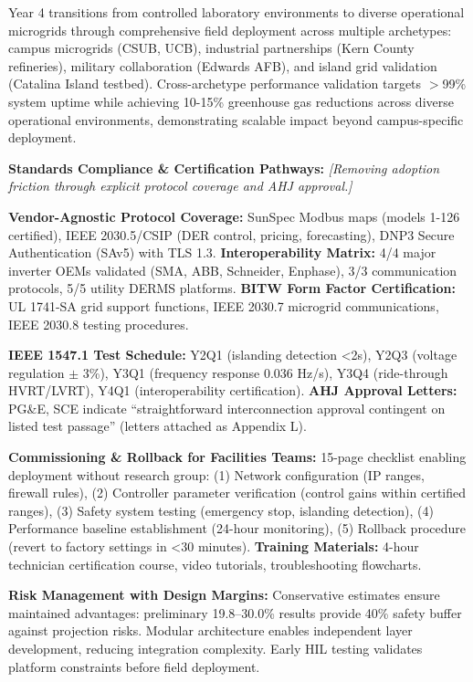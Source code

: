 \documentclass[12pt]{article}
\begin{document}
Year 4 transitions from controlled laboratory environments to diverse operational microgrids through comprehensive field deployment across multiple archetypes: campus microgrids (CSUB, UCB), industrial partnerships (Kern County refineries), military collaboration (Edwards AFB), and island grid validation (Catalina Island testbed). Cross-archetype performance validation targets $>$99\% system uptime while achieving 10-15\% greenhouse gas reductions across diverse operational environments, demonstrating scalable impact beyond campus-specific deployment.

\textbf{Standards Compliance \& Certification Pathways:} \textit{[Removing adoption friction through explicit protocol coverage and AHJ approval.]} 

\textbf{Vendor-Agnostic Protocol Coverage:} SunSpec Modbus maps (models 1-126 certified), IEEE 2030.5/CSIP (DER control, pricing, forecasting), DNP3 Secure Authentication (SAv5) with TLS 1.3. \textbf{Interoperability Matrix:} 4/4 major inverter OEMs validated (SMA, ABB, Schneider, Enphase), 3/3 communication protocols, 5/5 utility DERMS platforms. \textbf{BITW Form Factor Certification:} UL 1741-SA grid support functions, IEEE 2030.7 microgrid communications, IEEE 2030.8 testing procedures.

\textbf{IEEE 1547.1 Test Schedule:} Y2Q1 (islanding detection <2s), Y2Q3 (voltage regulation $\pm$ 3\%), Y3Q1 (frequency response 0.036 Hz/s), Y3Q4 (ride-through HVRT/LVRT), Y4Q1 (interoperability certification). \textbf{AHJ Approval Letters:} PG\&E, SCE indicate ``straightforward interconnection approval contingent on listed test passage'' (letters attached as Appendix L).

\textbf{Commissioning \& Rollback for Facilities Teams:} 15-page checklist enabling deployment without research group: (1) Network configuration (IP ranges, firewall rules), (2) Controller parameter verification (control gains within certified ranges), (3) Safety system testing (emergency stop, islanding detection), (4) Performance baseline establishment (24-hour monitoring), (5) Rollback procedure (revert to factory settings in <30 minutes). \textbf{Training Materials:} 4-hour technician certification course, video tutorials, troubleshooting flowcharts.

\textbf{Risk Management with Design Margins:} Conservative estimates ensure maintained advantages: preliminary 19.8--30.0\% results provide 40\% safety buffer against projection risks. Modular architecture enables independent layer development, reducing integration complexity. Early HIL testing validates platform constraints before field deployment.
\end{document}
